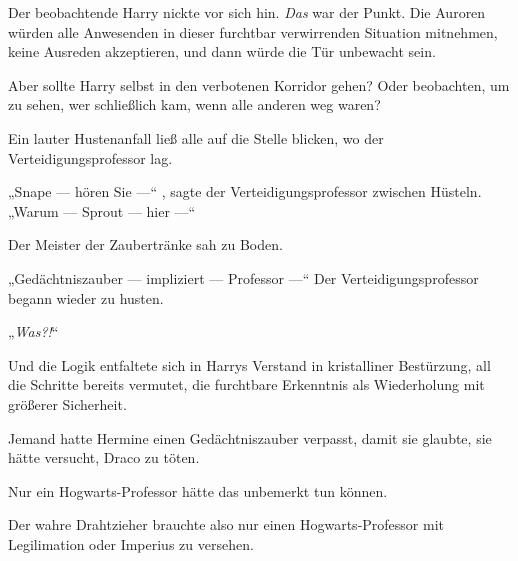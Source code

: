 Der beobachtende Harry nickte vor sich hin. \emph{Das} war der Punkt. Die Auroren würden alle Anwesenden in dieser furchtbar verwirrenden Situation mitnehmen, keine Ausreden akzeptieren, und dann würde die Tür unbewacht sein.

Aber sollte Harry selbst in den verbotenen Korridor gehen? Oder beobachten, um zu sehen, wer schließlich kam, wenn alle anderen weg waren?

Ein lauter Hustenanfall ließ alle auf die Stelle blicken, wo der Verteidigungsprofessor lag.

„Snape — hören Sie —“ , sagte der Verteidigungsprofessor zwischen Hüsteln.
„Warum — Sprout — hier —“

Der Meister der Zaubertränke sah zu Boden.

„Gedächtniszauber — impliziert — Professor —“
Der Verteidigungsprofessor begann wieder zu husten.

„\emph{Was?!}“

Und die Logik entfaltete sich in Harrys Verstand in kristalliner Bestürzung, all die Schritte bereits vermutet, die furchtbare Erkenntnis als Wiederholung mit größerer Sicherheit.

Jemand hatte Hermine einen Gedächtniszauber verpasst, damit sie glaubte, sie hätte versucht, Draco zu töten.

Nur ein Hogwarts-Professor hätte das unbemerkt tun können.

Der wahre Drahtzieher brauchte also nur einen Hogwarts-Professor mit Legilimation oder Imperius zu versehen.

